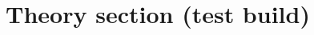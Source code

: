 \documentclass[11pt]{article}
\begin{document}
\title{Theory section (test build)}
\author{}
\date{}
\maketitle



\end{document}
